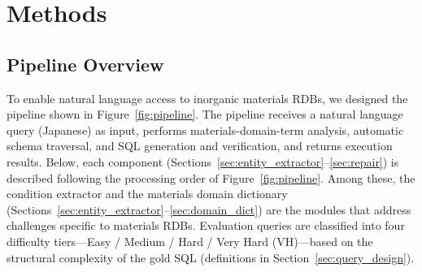 
\section{Methods}
\label{sec:method}

\subsection{Pipeline Overview}

To enable natural language access to inorganic materials RDBs, we designed the pipeline shown in Figure~\ref{fig:pipeline}. The pipeline receives a natural language query (Japanese) as input, performs materials-domain-term analysis, automatic schema traversal, and SQL generation and verification, and returns execution results. Below, each component (Sections~\ref{sec:entity_extractor}--\ref{sec:repair}) is described following the processing order of Figure~\ref{fig:pipeline}. Among these, the condition extractor and the materials domain dictionary (Sections~\ref{sec:entity_extractor}--\ref{sec:domain_dict}) are the modules that address challenges specific to materials RDBs. Evaluation queries are classified into four difficulty tiers---Easy / Medium / Hard / Very Hard (VH)---based on the structural complexity of the gold SQL (definitions in Section~\ref{sec:query_design}).

